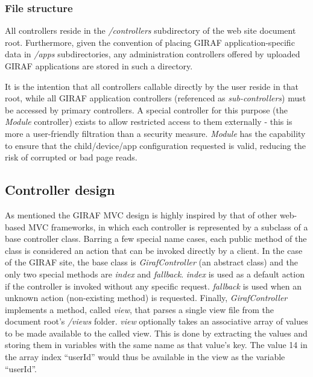 \subsubsection*{File structure}
All controllers reside in the \emph{/controllers} subdirectory of the web site document root. Furthermore, given the convention of placing GIRAF application-specific data in \emph{/apps} subdirectories, any administration controllers offered by uploaded GIRAF applications are stored in such a directory.

It is the intention that all controllers callable directly by the user reside in that root, while all GIRAF application controllers (referenced as \emph{sub-controllers}) must be accessed by primary controllers. A special controller for this purpose (the \emph{Module} controller) exists to allow restricted access to them externally - this is more a user-friendly filtration than a security measure. \emph{Module} has the capability to ensure that the child/device/app configuration requested is valid, reducing the risk of corrupted or bad page reads.

\subsection{Controller design}
\label{controller_design}
As mentioned the GIRAF MVC design is highly inspired by that of other web-based MVC frameworks, in which each controller is represented by a subclass of a base controller class. Barring a few special name cases, each public method of the class is considered an action that can be invoked directly by a client.
In the case of the GIRAF site, the base class is \emph{GirafController} (an abstract class) and the only two special methods are \emph{index} and \emph{fallback}. \emph{index} is used as a default action if the controller is invoked without any specific request. \emph{fallback} is used when an unknown action (non-existing method) is requested.
Finally, \emph{GirafController} implements a method, called \emph{view}, that parses a single view file from the document root's \emph{/views} folder. \emph{view} optionally takes an associative array of values to be made available to the called view. This is done by extracting the values and storing them in variables with the same name as that value's key. The value 14 in the array index ``userId'' would thus be available in the view as the variable ``userId''.

